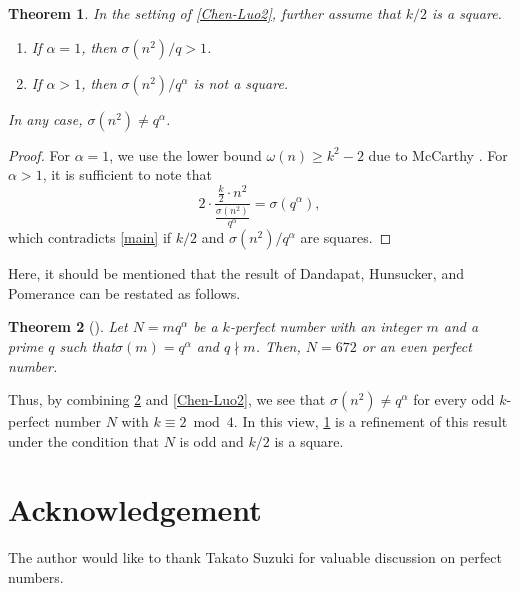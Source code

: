 \documentclass[11pt]{amsart}
\theoremstyle{plain}
\newtheorem{theorem}{Theorem}[section]
\theoremstyle{definition}
\begin{document}
\begin{theorem} \label{k-perfect}
In the setting of \cref{Chen-Luo2},
further assume that $k/2$ is a square.
\begin{enumerate}
\item
If $\alpha = 1$, then $\sigma(n^{2})/q > 1$. %

\item
If $\alpha > 1$, then $\sigma(n^{2})/q^{\alpha}$ is not a square.
\end{enumerate}
In any case, $\sigma(n^{2}) \neq q^{\alpha}$.
\end{theorem}

\begin{proof}
For $\alpha = 1$, we use the lower bound $\omega(n) \geq k^{2}-2$ due to McCarthy \cite[Corollary]{McCarthy}.
For $\alpha > 1$, it is sufficient to note that
\[
	2 \cdot \frac{\frac{k}{2} \cdot n^{2}}{\frac{\sigma(n^{2})}{q^{\alpha}}} = \sigma(q^{\alpha}),
\]
which contradicts \cref{main} if $k/2$ and $\sigma(n^{2})/q^{\alpha}$ are squares.
\end{proof}



Here, it should be mentioned that
the result \cite[Theorem 1]{Dandapat-Hunsucker-Pomerance} of Dandapat, Hunsucker, and Pomerance can be restated as follows.

\begin{theorem} [{\cite[Corollary]{Dandapat-Hunsucker-Pomerance}}] \label{DHP}
Let $N = mq^{\alpha}$ be a $k$-perfect number with an integer $m$ and a prime $q$ such that$\sigma(m) = q^{\alpha}$ and  $q \nmid m$.
Then, $N = 672$ or an even perfect number.
\end{theorem}

Thus, by combining \cref{DHP} and \cref{Chen-Luo2},
we see that $\sigma(n^{2}) \neq q^{\alpha}$ for every odd $k$-perfect number $N$ with $k \equiv 2 \bmod 4$.
In this view,
\cref{k-perfect} is a refinement of this result under the condition that $N$ is odd and $k/2$ is a square.



\appendix
\section*{Acknowledgement}
The author would like to thank Takato Suzuki for valuable discussion on perfect numbers.


 
\begin{bibdiv}
\begin{biblist}
\end{biblist}
\end{bibdiv}
\end{document}
